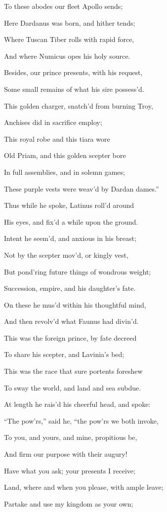 To these abodes our fleet Apollo sends;

Here Dardanus was born, and hither tends;

Where Tuscan Tiber rolls with rapid force,

And where Numicus opes his holy source.

Besides, our prince presents, with his request,

Some small remains of what his sire possess’d.

This golden charger, snatch’d from burning Troy,

Anchises did in sacrifice employ;

This royal robe and this tiara wore

Old Priam, and this golden scepter bore

In full assemblies, and in solemn games;

These purple vests were weav’d by Dardan dames.”

Thus while he spoke, Latinus roll’d around

His eyes, and fix’d a while upon the ground.

Intent he seem’d, and anxious in his breast;

Not by the scepter mov’d, or kingly vest,

But pond’ring future things of wondrous weight;

Succession, empire, and his daughter’s fate.

On these he mus’d within his thoughtful mind,

And then revolv’d what Faunus had divin’d.

This was the foreign prince, by fate decreed

To share his scepter, and Lavinia’s bed;

This was the race that sure portents foreshew

To sway the world, and land and sea subdue.

At length he rais’d his cheerful head, and spoke:

“The pow’rs,” said he, “the pow’rs we both invoke,

To you, and yours, and mine, propitious be,

And firm our purpose with their augury!

Have what you ask; your presents I receive;

Land, where and when you please, with ample leave;

Partake and use my kingdom as your own;


